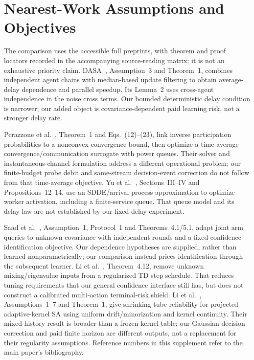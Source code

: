 \documentclass[journal]{IEEEtran}
\begin{document}
\section{Nearest-Work Assumptions and Objectives}
The comparison uses the accessible full preprints, with theorem and proof locators recorded in the accompanying source-reading matrix; it is not an exhaustive priority claim.
DASA~\cite{dalfabbro2024dasa}, Assumption~3 and Theorem~1, combines independent agent chains with median-based update filtering to obtain average-delay dependence and parallel speedup.
Its Lemma~2 uses cross-agent independence in the noise cross terms.
Our bounded deterministic delay condition is narrower; our added object is covariance-dependent paid learning risk, not a stronger delay rate.

Perazzone et al.~\cite{perazzone2025lyapunov}, Theorem~1 and Eqs.~(12)--(23), link inverse participation probabilities to a nonconvex convergence bound, then optimize a time-average convergence/communication surrogate with power queues.
Their solver and instantaneous-channel formulation address a different operational problem; our finite-budget probe debit and same-stream decision-event correction do not follow from that time-average objective.
Yu et al.~\cite{yu2025sdde}, Sections~III--IV and Propositions~12--14, use an SDDE/arrival-process approximation to optimize worker activation, including a finite-service queue.
That queue model and its delay law are not established by our fixed-delay experiment.

Saad et al.~\cite{saad2023covariance}, Assumption~1, Protocol~1 and Theorems~4.1/5.1, adapt joint arm queries to unknown covariance with independent rounds and a fixed-confidence identification objective.
Our dependence hypotheses are supplied, rather than learned nonparametrically; our comparison instead prices identification through the subsequent learner.
Li et al.~\cite{li2026parameterfree}, Theorem~4.12, remove unknown mixing/eigenvalue inputs from a regularized TD step schedule.
That reduces tuning requirements that our general confidence interface still has, but does not construct a calibrated multi-action terminal-risk shield.
Li et al.~\cite{li2026shrinkingtube}, Assumptions~1--7 and Theorem~1, give shrinking-tube reliability for projected adaptive-kernel SA using uniform drift/minorization and kernel continuity.
Their mixed-history result is broader than a frozen-kernel table; our Gaussian decision correction and paid finite horizon are different outputs, not a replacement for their regularity assumptions.
Reference numbers in this supplement refer to the main paper's bibliography.
\end{document}
